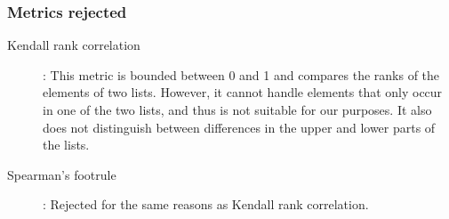 \subsubsection{Metrics rejected}
\begin{description}
	\item [Kendall rank correlation ] \cite{kendallNEWMEASURERANK1938b}: This metric is bounded between 0 and 1 and compares the ranks of the elements of two lists. However, it cannot handle elements that only occur in one of the two lists, and thus is not suitable for our purposes. It also does not distinguish between differences in the upper and lower parts of the lists.
	\item [Spearman's footrule] \cite{spearmanCorrelationCalculatedFaulty1910}: Rejected for the same reasons as Kendall rank correlation.
\end{description}


